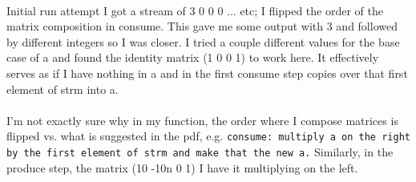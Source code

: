 \documentclass[a4paper,12pt]{article}
\begin{document}
\begin{enumerate}
\\
Initial run attempt I got a stream of 3 0 0 0 ... etc; I flipped the order of the matrix composition in consume. This gave me some output with 3 and followed by different integers so I was closer. I tried a couple different values for the base case of a and found the identity matrix (1 0 0 1) to work here. It effectively serves as if I have nothing in a and in the first consume step copies over that first element of strm into a.
\\\\
I'm not exactly sure why in my function, the order where I compose matrices is flipped vs. what is suggested in the pdf, e.g. \texttt{consume: multiply a on the right by the first element of strm and make that the new a.} Similarly, in the produce step, the matrix (10 -10n 0 1) I have it multiplying on the left.
\\

\end{enumerate}
\end{document}
